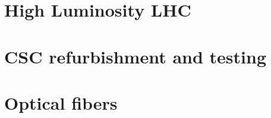 \section{High Luminosity LHC} \label{sec:HLLHC}


\section{CSC refurbishment and testing} \label{sec:RefurbishmentTesting}


\section{Optical fibers} \label{sec:OpticalFibers}
